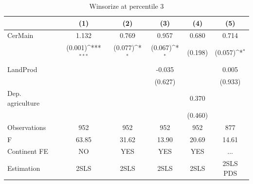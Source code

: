 \begin{table}[htbp]\centering
\def\sym#1{\ifmmode^{#1}\else\(^{#1}\)\fi}
\caption{Winsorize at percentile 3}
\begin{tabular}{l*{5}{c}}
\hline\hline
                &\multicolumn{1}{c}{(1)}         &\multicolumn{1}{c}{(2)}         &\multicolumn{1}{c}{(3)}         &\multicolumn{1}{c}{(4)}         &\multicolumn{1}{c}{(5)}         \\
\hline
CerMain         &    1.132         &    0.769         &    0.957         &    0.680         &    0.714         \\
                &  (0.001)\sym{***}&  (0.077)\sym{*}  &  (0.067)\sym{*}  &  (0.198)         &  (0.057)\sym{*}  \\
LandProd        &                  &                  &   -0.035         &                  &    0.005         \\
                &                  &                  &  (0.627)         &                  &  (0.933)         \\
Dep. agriculture&                  &                  &                  &    0.370         &                  \\
                &                  &                  &                  &  (0.460)         &                  \\
\hline
Observations    &      952         &      952         &      952         &      952         &      877         \\
F               &    63.85         &    31.62         &    13.90         &    20.69         &    14.61         \\
Continent FE    &       NO         &      YES         &      YES         &      YES         &      ...         \\
Estimation      &     2SLS         &     2SLS         &     2SLS         &     2SLS         & 2SLS PDS         \\
\hline\hline
\end{tabular}
\end{table}
